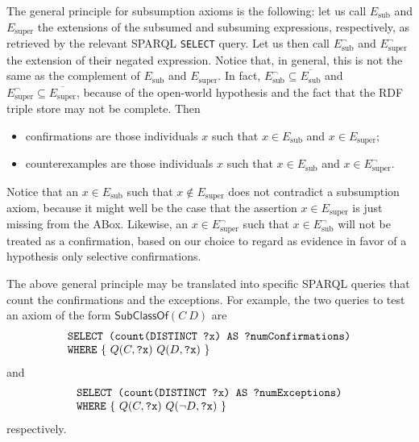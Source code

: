 \documentclass{llncs}
\begin{document}
The general principle for subsumption axioms is the following:
let us call $E_\mathrm{sub}$ and $E_\mathrm{super}$ the extensions of the subsumed and subsuming expressions, respectively, as retrieved by the relevant
SPARQL \texttt{SELECT} query. Let us then call $E_\mathrm{sub}^\neg$ and $E_\mathrm{super}^\neg$
the extension of their negated expression. Notice that, in general, this is not the
same as the complement of $E_\mathrm{sub}$ and $E_\mathrm{super}$. In fact,
$E_\mathrm{sub}^\neg \subseteq \overline{E_\mathrm{sub}}$ and
$E_\mathrm{super}^\neg \subseteq \overline{E_\mathrm{super}}$,
because of the open-world hypothesis and the fact that the RDF triple store may not
be complete. Then
\begin{itemize}
\item confirmations are those individuals $x$ such that
  $x \in E_\mathrm{sub}$ and $x \in E_\mathrm{super}$;
\item counterexamples are those individuals $x$ such that
  $x \in E_\mathrm{sub}$ and $x \in E_\mathrm{super}^\neg$.
\end{itemize}
Notice that an $x \in E_\mathrm{sub}$ such that $x \notin E_\mathrm{super}$
does not contradict a subsumption axiom, because it might well be the case
that the assertion $x \in E_\mathrm{super}$ is just missing from the ABox.
Likewise, an $x \in E_\mathrm{super}^\neg$ such that $x \in E_\mathrm{sub}^\neg$
will not be treated as a confirmation, based on our choice to regard as
evidence in favor of a hypothesis only selective confirmations.

The above general principle may be translated into specific SPARQL queries
that count the confirmations and the exceptions. For example, the two queries
to test an axiom of the form $\mathsf{SubClassOf}(C\ D)$ are
\begin{equation}
  \begin{minipage}[c]{5in}
    \begin{tabbing}
      \quad\=\quad\=\quad\=\kill
      \texttt{SELECT (count(DISTINCT ?x) AS ?numConfirmations)}\\
      \texttt{WHERE} \{ $Q(C, \mbox{\tt ?x})$ $Q(D, \mbox{\tt ?x})$ \}
    \end{tabbing}
  \end{minipage}
\end{equation}
and
\begin{equation}
  \begin{minipage}[c]{5in}
    \begin{tabbing}
      \quad\=\quad\=\quad\=\kill
      \texttt{SELECT (count(DISTINCT ?x) AS ?numExceptions)}\\
      \texttt{WHERE} \{ $Q(C, \mbox{\tt ?x})$ $Q(\neg D, \mbox{\tt ?x})$ \}
    \end{tabbing}
  \end{minipage}
\end{equation}
respectively.
\end{document}
